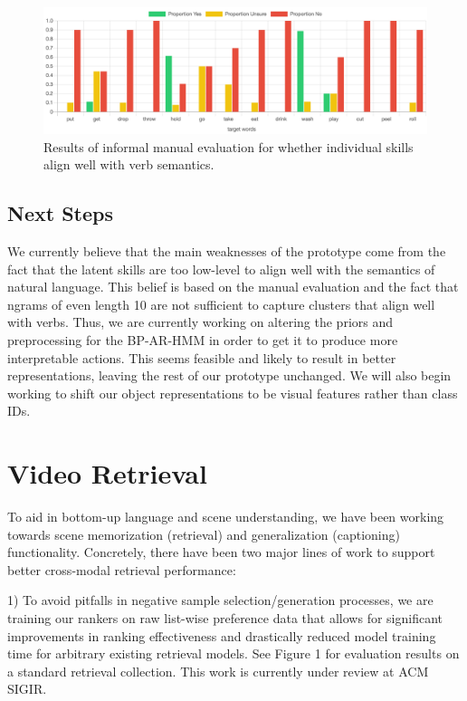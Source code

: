 \documentclass[11pt]{article}
\begin{document}
\begin{figure}[ht!]
\centering
\includegraphics[width=\linewidth]{figures/human_eval}
\caption{Results of informal manual evaluation for whether individual skills align well with verb semantics.}
\label{fig:human-eval}
\end{figure}

\subsection{Next Steps}

We currently believe that the main weaknesses of the prototype come from the fact that the latent skills are too low-level to align well with the semantics of natural language. This belief is based on the manual evaluation and the fact that ngrams of even length 10 are not sufficient to capture clusters that align well with verbs. Thus, we are currently working on altering the priors and preprocessing for the BP-AR-HMM in order to get it to produce more interpretable actions. This seems feasible and likely to result in better representations, leaving the rest of our prototype unchanged. We will also begin working to shift our object representations to be visual features rather than class IDs.

\section{Video Retrieval} 
\label{sec:ir}

To aid in bottom-up language and scene understanding, we have been working towards scene memorization (retrieval) and generalization (captioning) functionality. Concretely, there have been two major lines of work to support better cross-modal retrieval performance: 

1) To avoid pitfalls in negative sample selection/generation processes, we are training our rankers on raw list-wise preference data that allows for significant improvements in ranking effectiveness and drastically reduced model training time for arbitrary existing retrieval models. See Figure 1 for evaluation results on a standard retrieval collection. This work is currently under review at ACM SIGIR.
\end{document}
